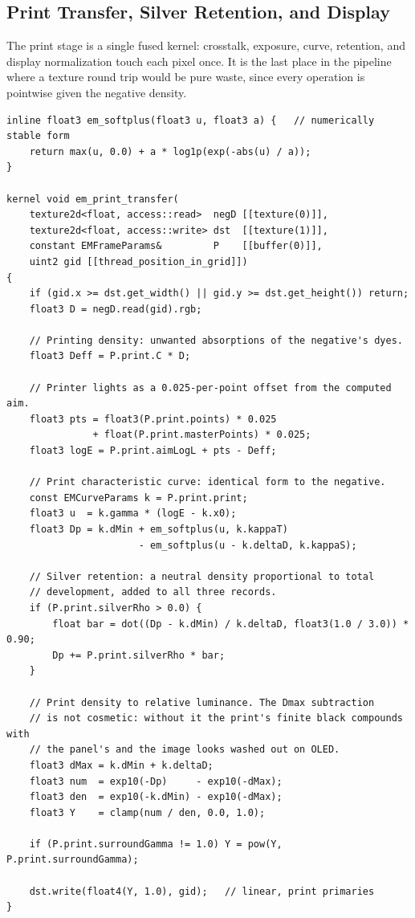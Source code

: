 \subsection{Print Transfer, Silver Retention, and Display}

The print stage is a single fused kernel: crosstalk, exposure, curve,
retention, and display normalization touch each pixel once. It is the last
place in the pipeline where a texture round trip would be pure waste, since
every operation is pointwise given the negative density.

\begin{lstlisting}[language=Metal, caption={Fused print transfer and display conversion.}, label={lst:print}]
inline float3 em_softplus(float3 u, float3 a) {   // numerically stable form
    return max(u, 0.0) + a * log1p(exp(-abs(u) / a));
}

kernel void em_print_transfer(
    texture2d<float, access::read>  negD [[texture(0)]],
    texture2d<float, access::write> dst  [[texture(1)]],
    constant EMFrameParams&         P    [[buffer(0)]],
    uint2 gid [[thread_position_in_grid]])
{
    if (gid.x >= dst.get_width() || gid.y >= dst.get_height()) return;
    float3 D = negD.read(gid).rgb;

    // Printing density: unwanted absorptions of the negative's dyes.
    float3 Deff = P.print.C * D;

    // Printer lights as a 0.025-per-point offset from the computed aim.
    float3 pts = float3(P.print.points) * 0.025
               + float(P.print.masterPoints) * 0.025;
    float3 logE = P.print.aimLogL + pts - Deff;

    // Print characteristic curve: identical form to the negative.
    const EMCurveParams k = P.print.print;
    float3 u  = k.gamma * (logE - k.x0);
    float3 Dp = k.dMin + em_softplus(u, k.kappaT)
                       - em_softplus(u - k.deltaD, k.kappaS);

    // Silver retention: a neutral density proportional to total
    // development, added to all three records.
    if (P.print.silverRho > 0.0) {
        float bar = dot((Dp - k.dMin) / k.deltaD, float3(1.0 / 3.0)) * 0.90;
        Dp += P.print.silverRho * bar;
    }

    // Print density to relative luminance. The Dmax subtraction
    // is not cosmetic: without it the print's finite black compounds with
    // the panel's and the image looks washed out on OLED.
    float3 dMax = k.dMin + k.deltaD;
    float3 num  = exp10(-Dp)     - exp10(-dMax);
    float3 den  = exp10(-k.dMin) - exp10(-dMax);
    float3 Y    = clamp(num / den, 0.0, 1.0);

    if (P.print.surroundGamma != 1.0) Y = pow(Y, P.print.surroundGamma);

    dst.write(float4(Y, 1.0), gid);   // linear, print primaries
}
\end{lstlisting}

